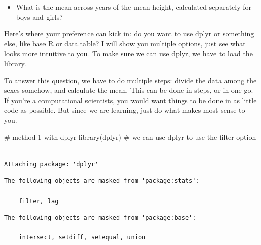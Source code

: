 \documentclass[
  letterpaper,
  DIV=11,
  numbers=noendperiod]{scrreprt}
\newenvironment{Shaded}{}{}
\newcommand{\CommentTok}[1]{\textcolor[rgb]{0.42,0.45,0.49}{#1}}
\newcommand{\FunctionTok}[1]{\textcolor[rgb]{0.44,0.26,0.76}{#1}}
\newcommand{\NormalTok}[1]{\textcolor[rgb]{0.14,0.16,0.18}{#1}}
\providecommand{\tightlist}{%
  \setlength{\itemsep}{0pt}\setlength{\parskip}{0pt}}\usepackage{longtable,booktabs,array}
\begin{document}
\begin{itemize}
\tightlist
\item
  What is the mean across years of the mean height, calculated
  separately for boys and girls?
\end{itemize}

\begin{tcolorbox}[enhanced jigsaw, arc=.35mm, left=2mm, titlerule=0mm, rightrule=.15mm, colframe=quarto-callout-tip-color-frame, coltitle=black, colback=white, opacityback=0, bottomtitle=1mm, bottomrule=.15mm, colbacktitle=quarto-callout-tip-color!10!white, breakable, title=\textcolor{quarto-callout-tip-color}{\faLightbulb}\hspace{0.5em}{Code and answer}, toptitle=1mm, toprule=.15mm, opacitybacktitle=0.6, leftrule=.75mm]

Here's where your preference can kick in: do you want to use dplyr or
something else, like base R or data.table? I will show you multiple
options, just see what looks more intuitive to you. To make sure we can
use dplyr, we have to load the library.

To answer this question, we have to do multiple steps: divide the data
among the sexes somehow, and calculate the mean. This can be done in
steps, or in one go. If you're a computational scientists, you would
want things to be done in as little code as possible. But since we are
learning, just do what makes most sense to you.

\begin{Shaded}
\begin{Highlighting}[]
\CommentTok{\# method 1 with dplyr}
\FunctionTok{library}\NormalTok{(dplyr) }\CommentTok{\# we can use dplyr to use the filter option}
\end{Highlighting}
\end{Shaded}

\begin{verbatim}

Attaching package: 'dplyr'
\end{verbatim}

\begin{verbatim}
The following objects are masked from 'package:stats':

    filter, lag
\end{verbatim}

\begin{verbatim}
The following objects are masked from 'package:base':

    intersect, setdiff, setequal, union
\end{verbatim}


\end{tcolorbox}
\end{document}
